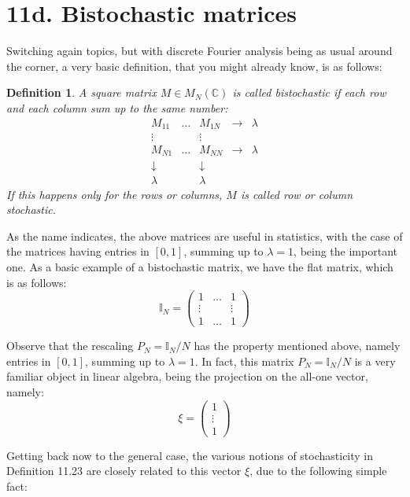 \documentclass[12pt]{amsbook}
\newtheorem{definition}[theorem]{Definition}
\begin{document}
\section*{11d. Bistochastic matrices} 

Switching again topics, but with discrete Fourier analysis being as usual around the corner, a very basic definition, that you might already know, is as follows:


\begin{definition}
A square matrix $M\in M_N(\mathbb C)$ is called bistochastic if each row and each column sum up to the same number:
$$\begin{matrix}
M_{11}&\ldots&M_{1N}&\to&\lambda\\
\vdots&&\vdots\\
M_{N1}&\ldots&M_{NN}&\to&\lambda\\
\downarrow&&\downarrow\\
\lambda&&\lambda
\end{matrix}$$
If this happens only for the rows or columns, $M$ is called row or column stochastic.
\end{definition}

As the name indicates, the above matrices are useful in statistics, with the case of the matrices having entries in $[0,1]$, summing up to $\lambda=1$, being the important one. As a basic example of a bistochastic matrix, we have the flat matrix, which is as follows:
$$\mathbb I_N=\begin{pmatrix}
1&\ldots&1\\
\vdots&&\vdots\\
1&\ldots&1
\end{pmatrix}$$

Observe that the rescaling $P_N=\mathbb I_N/N$ has the property mentioned above, namely entries in $[0,1]$, summing up to $\lambda=1$. In fact, this matrix $P_N=\mathbb I_N/N$ is a very familiar object in linear algebra, being the projection on the all-one vector, namely:
$$\xi=\begin{pmatrix}
1\\
\vdots\\
1
\end{pmatrix}$$ 

Getting back now to the general case, the various notions of stochasticity in Definition 11.23 are closely related to this vector $\xi$, due to the following simple fact:
\end{document}
